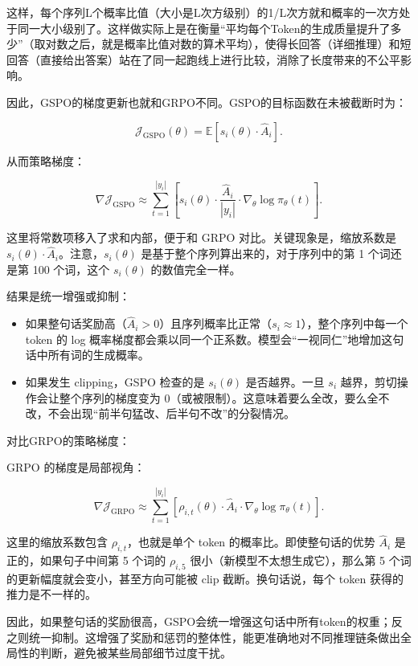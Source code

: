 这样，每个序列L个概率比值（大小是L次方级别）的1/L次方就和概率的一次方处于同一大小级别了。这样做实际上是在衡量``平均每个Token的生成质量提升了多少''（取对数之后，就是概率比值对数的算术平均），使得长回答（详细推理）和短回答（直接给出答案）站在了同一起跑线上进行比较，消除了长度带来的不公平影响。

因此，GSPO的梯度更新也就和GRPO不同。GSPO的目标函数在未被截断时为：

\[
\mathcal{J}_{\mathrm{GSPO}}(\theta)
=
\mathbb{E}
\left[
s_i(\theta)\cdot \hat{A}_i
\right].
\]

从而策略梯度：

\[
\nabla \mathcal{J}_{\mathrm{GSPO}}
\approx
\sum_{t=1}^{|y_i|}
\left[
s_i(\theta)
\cdot
\frac{\hat{A}_i}{|y_i|}
\cdot
\nabla_\theta \log \pi_\theta(t)
\right].
\]

这里将常数项移入了求和内部，便于和 GRPO 对比。关键现象是，缩放系数是 \(s_i(\theta)\cdot \hat{A}_i\)。注意，\(s_i(\theta)\) 是基于整个序列算出来的，对于序列中的第 1 个词还是第 100 个词，这个 \(s_i(\theta)\) 的数值完全一样。

结果是统一增强或抑制：

\begin{itemize}
\tightlist
\item
  如果整句话奖励高（\(\hat{A}_i>0\)）且序列概率比正常（\(s_i\approx 1\)），整个序列中每一个 token 的 log 概率梯度都会乘以同一个正系数。模型会``一视同仁''地增加这句话中所有词的生成概率。
\item
  如果发生 clipping，GSPO 检查的是 \(s_i(\theta)\) 是否越界。一旦 \(s_i\) 越界，剪切操作会让整个序列的梯度变为 0（或被限制）。这意味着要么全改，要么全不改，不会出现``前半句猛改、后半句不改''的分裂情况。
\end{itemize}

对比GRPO的策略梯度：

GRPO 的梯度是局部视角：

\[
\nabla \mathcal{J}_{\mathrm{GRPO}}
\approx
\sum_{t=1}^{|y_i|}
\left[
\rho_{i,t}(\theta)
\cdot
\hat{A}_i
\cdot
\nabla_\theta \log \pi_\theta(t)
\right].
\]

这里的缩放系数包含 \(\rho_{i,t}\)，也就是单个 token 的概率比。即使整句话的优势 \(\hat{A}_i\) 是正的，如果句子中间第 5 个词的 \(\rho_{i,5}\) 很小（新模型不太想生成它），那么第 5 个词的更新幅度就会变小，甚至方向可能被 clip 截断。换句话说，每个 token 获得的推力是不一样的。

因此，如果整句话的奖励很高，GSPO会统一增强这句话中所有token的权重；反之则统一抑制。这增强了奖励和惩罚的整体性，能更准确地对不同推理链条做出全局性的判断，避免被某些局部细节过度干扰。


